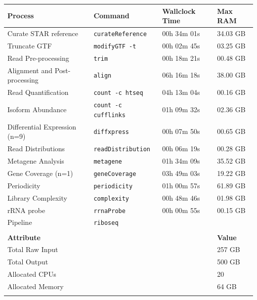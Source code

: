 \documentclass[10pt, oneside]{article}
\begin{document}
\begin{table}[h]
    \centering
{}
\begin{tabular}{p{5cm}p{3.5cm}p{2.7cm}p{1.8cm}}
\textbf{Process} & \textbf{Command} & \textbf{Wallclock Time} & \textbf{Max RAM}\\
  \hline
  Curate STAR reference & \texttt{curateReference} & 00h 34m 01s & 34.03 GB \\
  \hline
  Truncate GTF & \texttt{modifyGTF -t} & 00h 02m 45s & 03.25 GB \\
  \hline
  Read Pre-processing & \texttt{trim} & 00h 18m 21s & 00.48 GB \\
  \hline
  Alignment and Post-processing & \texttt{align} & 06h 16m 18s & 38.00 GB \\
  \hline
  Read Quantification & \texttt{count -c htseq} & 04h 13m 04s & 00.16 GB \\
  \hline
  Isoform Abundance & \texttt{count -c cufflinks} & 01h 09m 32s & 02.36 GB \\
  \hline
  Differential Expression (n=9) & \texttt{diffxpress} & 00h 07m 50s & 00.65 GB \\
  \hline
  Read Distributions & \texttt{readDistribution} & 00h 06m 19s & 00.28 GB \\
  \hline
  Metagene Analysis & \texttt{metagene} & 01h 34m 09s & 35.52 GB \\
  \hline
  Gene Coverage (n=1) & \texttt{geneCoverage} & 03h 49m 03s & 19.22 GB \\
  \hline
  Periodicity & \texttt{periodicity} & 01h 00m 57s & 61.89 GB \\
  \hline
  Library Complexity & \texttt{complexity} & 00h 48m 46s & 01.98 GB \\
  \hline
  rRNA probe & \texttt{rrnaProbe} & 00h 00m 55s & 00.15 GB \\
  \hline
  Pipeline & \texttt{riboseq} &  & \\
  \hline
  & & & \\
  \hline
  \hline
  \textbf{Attribute} & & & \textbf{Value}\\
  \hline
  Total Raw Input & & & 257 GB \\
  \hline
  Total Output & & & 500 GB \\
  \hline
  Allocated CPUs & & & 20 \\
  \hline
  Allocated Memory & & & 64 GB \\
 \label{tab:chpc_performance}
\end{tabular}
\end{table}
\end{document}
